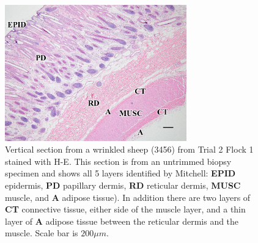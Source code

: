 %

\begin{figure}[!h]
  \centering
  \captionsetup{width=0.7\textwidth}
  \includegraphics[width=0.7\textwidth]{fig3.jpg}
  \caption{Vertical section from a wrinkled sheep (3456) from Trial 2 Flock 1 stained with H-E. This section is from an untrimmed biopsy specimen and shows all 5 layers  identified by Mitchell: {\bf EPID} epidermis, {\bf PD} papillary dermis, {\bf RD} reticular dermis, {\bf MUSC} muscle, and {\bf A} adipose tissue). In addition there are two layers of {\bf CT} connective tissue, either side of the muscle layer, and a thin layer of {\bf A} adipose tissue between the reticular dermis and the muscle. Scale bar is $200\mu m$.}
  \label{fig:trial2he}
\end{figure}

%

